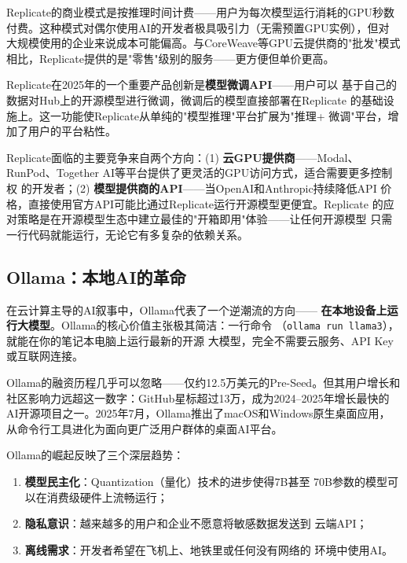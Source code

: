 Replicate的商业模式是按推理时间计费——用户为每次模型运行消耗的GPU秒数
付费。这种模式对偶尔使用AI的开发者极具吸引力（无需预置GPU实例），但对
大规模使用的企业来说成本可能偏高。与CoreWeave等GPU云提供商的"批发"模式
相比，Replicate提供的是"零售"级别的服务——更方便但单价更高。

Replicate在2025年的一个重要产品创新是\textbf{模型微调API}——用户可以
基于自己的数据对Hub上的开源模型进行微调，微调后的模型直接部署在Replicate
的基础设施上。这一功能使Replicate从单纯的"模型推理"平台扩展为"推理+
微调"平台，增加了用户的平台粘性。

Replicate面临的主要竞争来自两个方向：(1) \textbf{云GPU提供商}——Modal、
RunPod、Together AI等平台提供了更灵活的GPU访问方式，适合需要更多控制权
的开发者；(2) \textbf{模型提供商的API}——当OpenAI和Anthropic持续降低API
价格，直接使用官方API可能比通过Replicate运行开源模型更便宜。Replicate
的应对策略是在开源模型生态中建立最佳的"开箱即用"体验——让任何开源模型
只需一行代码就能运行，无论它有多复杂的依赖关系。

\subsection{Ollama：本地AI的革命}
\label{subsec:ollama}

在云计算主导的AI叙事中，Ollama代表了一个逆潮流的方向——
\textbf{在本地设备上运行大模型}。Ollama的核心价值主张极其简洁：一行命令
（\texttt{ollama run llama3}），就能在你的笔记本电脑上运行最新的开源
大模型，完全不需要云服务、API Key或互联网连接。

Ollama的融资历程几乎可以忽略——仅约12.5万美元的Pre-Seed。但其用户增长和
社区影响力远超这一数字：GitHub星标超过13万，成为2024--2025年增长最快的
AI开源项目之一。2025年7月，Ollama推出了macOS和Windows原生桌面应用，
从命令行工具进化为面向更广泛用户群体的桌面AI平台。

Ollama的崛起反映了三个深层趋势：
\begin{enumerate}
  \item \textbf{模型民主化}：Quantization（量化）技术的进步使得7B甚至
    70B参数的模型可以在消费级硬件上流畅运行；
  \item \textbf{隐私意识}：越来越多的用户和企业不愿意将敏感数据发送到
    云端API；
  \item \textbf{离线需求}：开发者希望在飞机上、地铁里或任何没有网络的
    环境中使用AI。
\end{enumerate}

